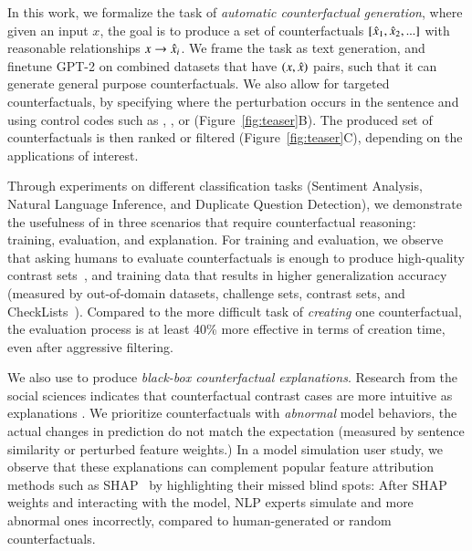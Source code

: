 In this work, we formalize the task of \emph{automatic counterfactual generation}, where given an input $x$, the goal is to produce a set of counterfactuals $[\hat{x}_1, \hat{x}_2, ...]$ with reasonable relationships $x \rightarrow \hat{x}_i$. 
We frame the task as text generation, and finetune GPT-2 \cite{radford2019language} on combined datasets that have $(x, \hat{x})$ pairs, such that it can generate general purpose counterfactuals. 
We also allow for targeted counterfactuals, by specifying where the perturbation occurs in the sentence \cite{donahue2020enabling} and using control codes such as , , or  (Figure~\ref{fig:teaser}B). 
The produced set of counterfactuals is then ranked or filtered (Figure~\ref{fig:teaser}C), depending on the applications of interest.

Through experiments on different classification tasks (Sentiment Analysis, Natural Language Inference, and Duplicate Question Detection), we demonstrate the usefulness of \sysname in three scenarios that require counterfactual reasoning: training, evaluation, and explanation. 
For training and evaluation, we observe that asking humans to evaluate counterfactuals is enough to produce high-quality contrast sets~\cite{gardner2020contrast}, and training data that results in higher generalization accuracy (measured by out-of-domain datasets, challenge sets, contrast sets, and CheckLists~\cite{checklist:acl20}).
Compared to the more difficult task of \emph{creating} one counterfactual, the evaluation process is at least 40\% more effective in terms of creation time, even after aggressive filtering.

We also use \sysname to produce \emph{black-box counterfactual explanations}. 
Research from the social sciences indicates that counterfactual contrast cases are more intuitive as explanations \cite{miller}.
We prioritize counterfactuals with \emph{abnormal} model behaviors, \ie the actual changes in prediction do not match the expectation (measured by sentence similarity or perturbed feature weights.)
In a model simulation user study, we observe that these explanations can complement popular feature attribution methods such as SHAP~\cite{NIPS2017_7062} by highlighting their missed blind spots: 
After SHAP weights and interacting with the model, NLP experts simulate  and  more abnormal ones incorrectly, compared to human-generated or random counterfactuals.